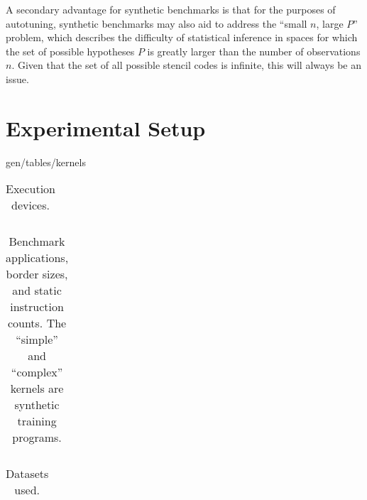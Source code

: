 A secondary advantage for synthetic benchmarks is that for the
purposes of autotuning, synthetic benchmarks may also aid to address
the ``small $n$, large $P$'' problem, which describes the difficulty
of statistical inference in spaces for which the set of possible
hypotheses $P$ is greatly larger than the number of observations
$n$. Given that the set of all possible stencil codes is infinite,
this will always be an issue.


\section{Experimental Setup}

gen/tables/kernels


\begin{table}
\footnotesize
\centering
\begin{tabular}{| L{5.5cm} | L{1.5cm} | L{1.5cm} | L{1.5cm} | L{1.5cm} | L{1.5cm} |}
\hline

\hline
\end{tabular}
\caption{%
  Execution devices. %
}
\label{tab:hw}
\end{table}

\begin{table}
\footnotesize
\centering
\begin{tabular}{| l | l | l | l | l | l |}
\hline

\hline
\end{tabular}
\caption{%
  Benchmark applications, border sizes, and static instruction counts.
  The ``simple'' and ``complex'' kernels are synthetic training
  programs. %
}
\label{tab:kernels}
\end{table}

\begin{table}
\footnotesize
\centering
\begin{tabular}{| l | l | l | l |}
\hline

\hline
\end{tabular}
\caption{%
  Datasets used.%
}
\label{tab:datasets}
\end{table}

